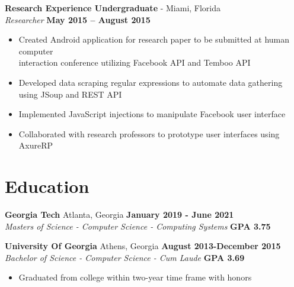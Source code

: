 \documentclass[margin,line]{resume}
\begin{document}
\begin{resume}
	\textbf{Research Experience Undergraduate} - Miami, Florida \vspace{1mm}\\\vspace{1mm}%
	\textsl{Researcher} \hfill \textbf{May 2015 -- August 2015}
	\begin{itemize}
		\item Created Android application for research paper to be submitted at human computer\\
		interaction conference utilizing Facebook API and Temboo API
		\item Developed data scraping regular expressions to automate data gathering using JSoup and REST API
		\item Implemented JavaScript injections to manipulate Facebook user interface
		\item Collaborated with research professors to prototype user interfaces using AxureRP
	\end{itemize}
	
	
	\section{\mysidestyle Education}
	
	\textbf{Georgia Tech} Atlanta, Georgia \hfill \textbf{January 2019 - June 2021}\\
	\textsl{Masters of Science - Computer Science - Computing Systems} \hfill \textbf{GPA 3.75} \vspace{2mm}
	
	\textbf{University Of Georgia} Athens, Georgia \hfill \textbf{August 2013-December 2015} \\
	\textsl{Bachelor of Science - Computer Science - Cum Laude} \hfill \textbf{GPA 3.69}\vspace{2mm}
	\begin{itemize}
		\item Graduated from college within two-year time frame with honors
	\end{itemize}

	\end{resume}
	
\end{document}
